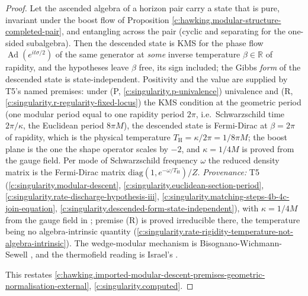 \documentclass[11pt]{article}
\theoremstyle{definition}
\theoremstyle{plain}
\providecommand{\R}{}\renewcommand{\R}{\mathbb{R}}
\providecommand{\TH}{}\renewcommand{\TH}{T_{\mathrm{H}}}
\begin{document}
\begin{proof}
Let the ascended algebra of a horizon pair carry a state that is pure, invariant under the boost flow of Proposition \ref{c:hawking.modular-structure-completed-pair}, and entangling across the pair (cyclic and separating for the one-sided subalgebra). Then the descended state is KMS for the phase flow $\operatorname{Ad}(e^{it\sigma/2})$ of the same generator at \emph{some} inverse temperature $\beta \in \R$ of rapidity, and the hypotheses leave $\beta$ free, its sign included; the Gibbs \emph{form} of the descended state is state-independent. Positivity and the value are supplied by T5's named premises: under (P, \ref{c:singularity.p-univalence}) univalence and (R, \ref{c:singularity.r-regularity-fixed-locus}) the KMS condition at the geometric period (one modular period equal to one rapidity period $2\pi$, i.e.\ Schwarzschild time $2\pi/\kappa$, the Euclidean period $8\pi M$), the descended state is Fermi-Dirac at $\beta = 2\pi$ of rapidity, which is the physical temperature $\TH = \kappa/2\pi = 1/8\pi M$; the boost plane is the one the shape operator scales by $-2$, and $\kappa = 1/4M$ is proved from the gauge field. Per mode of Schwarzschild frequency $\omega$ the reduced density matrix is the Fermi-Dirac matrix $\mathrm{diag}(1, e^{-\omega/\TH})/Z$. \emph{Provenance:} T5 \cite[Thms.~7.3 and 7.6, Prems.~7.8 and 7.19, Prop.~7.18, Thm.~7.20, Cor.~6.4]{ButlerT5} (\ref{c:singularity.modular-descent}, \ref{c:singularity.euclidean-section-period}, \ref{c:singularity.rate-discharge-hypothesis-iii}, \ref{c:singularity.matching-steps-4b-4c-join-equation}, \ref{c:singularity.descended-form-state-independent}), with $\kappa = 1/4M$ from the gauge field in \cite[App.~A]{ButlerT5}; premise (R) is proved irreducible there, the temperature being no algebra-intrinsic quantity \cite[Thm.~7.16]{ButlerT5} (\ref{c:singularity.rate-rigidity-temperature-not-algebra-intrinsic}). The wedge-modular mechanism is Bisognano-Wichmann-Sewell \cite{BisognanoWichmann1976, Sewell1982}, and the thermofield reading is Israel's \cite{Israel1976}.

This restates \ref{c:hawking.imported-modular-descent-premises-geometric-normalisation-external}, \ref{c:singularity.computed}.

\end{proof}
\end{document}
